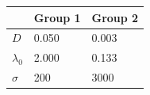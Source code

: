
\begin{tabular}{lll}
\toprule
  & Group 1 & Group 2\\
\midrule
$D$ & 0.050 & 0.003\\
$\lambda_0$ & 2.000 & 0.133\\
$\sigma$ & 200 & 3000\\
\bottomrule
\end{tabular}
